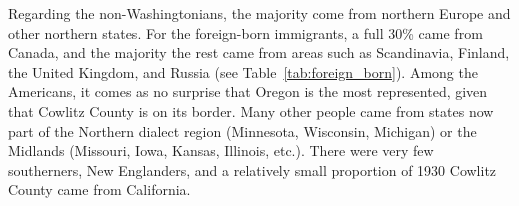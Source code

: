 \begin{table}[ht]
    \centering
    \caption[Number of non-Washingtonians by state living in Cowlitz County in 1930.]{Number of non-Washingtonians by state living in Cowlitz County in 1930. Only states that contributed to more than 2\% of the total non-Washingtonian population are included here, but all US states were represented in this community. There were 1250 people from the other states.}
    \label{tab:non_washingtonians}
\end{table}

Regarding the non-Washingtonians, the majority come from northern Europe and other northern states. For the foreign-born immigrants, a full 30\% came from Canada, and the majority the rest came from areas such as Scandinavia, Finland, the United Kingdom, and Russia (see Table~\ref{tab:foreign_born}). Among the Americans, it comes as no surprise that Oregon is the most represented, given that Cowlitz County is on its border. Many other people came from states now part of the Northern dialect region (Minnesota, Wisconsin, Michigan) or the Midlands (Missouri, Iowa, Kansas, Illinois, etc.). There were very few southerners, New Englanders, and a relatively small proportion of 1930 Cowlitz County came from California.

